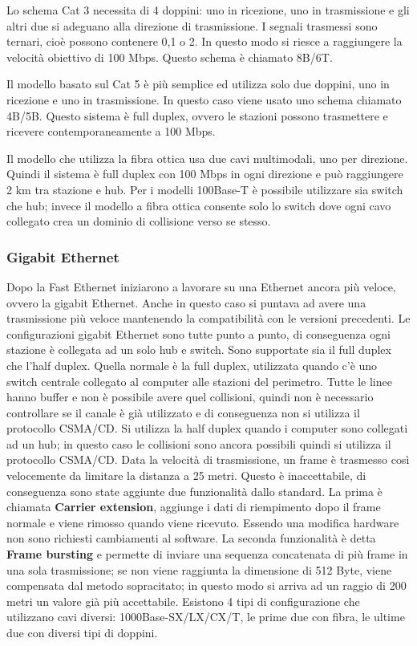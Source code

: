 Lo schema Cat 3 necessita di 4 doppini: uno in ricezione, uno in trasmissione e gli altri due si adeguano alla direzione di trasmissione.
I segnali trasmessi sono ternari, cioè possono contenere 0,1 o 2. 
In questo modo si riesce a raggiungere la velocità obiettivo di 100 Mbps. Questo schema è chiamato 8B/6T.

Il modello basato sul Cat 5 è più semplice ed utilizza solo due doppini, uno in ricezione e uno in trasmissione.
In questo caso viene usato uno schema chiamato 4B/5B.
Questo sistema è full duplex, ovvero le stazioni possono trasmettere e ricevere contemporaneamente a 100 Mbps.

Il modello che utilizza la fibra ottica usa due cavi multimodali, uno per direzione.
Quindi il sistema è full duplex con 100 Mbps in ogni direzione e può raggiungere 2 km tra stazione e hub.
Per i modelli 100Base-T è possibile utilizzare sia switch che hub;
invece il modello a fibra ottica consente solo lo switch dove ogni cavo collegato crea un dominio di collisione verso se stesso. 

\subsubsection{Gigabit Ethernet}
Dopo la Fast Ethernet iniziarono a lavorare su una Ethernet ancora più veloce, ovvero la gigabit Ethernet.
Anche in questo caso si puntava ad avere una trasmissione più veloce mantenendo la compatibilità con le versioni precedenti.
Le configurazioni gigabit Ethernet sono tutte punto a punto, di conseguenza ogni stazione è collegata ad un solo hub e switch.
Sono supportate sia il full duplex che l'half duplex.
Quella normale è la full duplex, utilizzata quando c'è uno switch centrale collegato al computer alle stazioni del perimetro.
Tutte le linee hanno buffer e non è possibile avere quel collisioni, quindi non è necessario controllare se il canale è già utilizzato e di conseguenza non si utilizza il protocollo CSMA/CD. 
Si utilizza la half duplex quando i computer sono collegati ad un hub; 
in questo caso le collisioni sono ancora possibili quindi si utilizza il protocollo CSMA/CD.
Data la velocità di trasmissione, un frame è trasmesso così velocemente da limitare la distanza a 25 metri.
Questo è inaccettabile, di conseguenza sono state aggiunte due funzionalità dallo standard.
La prima è chiamata \textbf{Carrier extension}, aggiunge i dati di riempimento dopo il frame normale e viene rimosso quando viene ricevuto. 
Essendo una modifica hardware non sono richiesti cambiamenti al software. 
La seconda funzionalità è detta \textbf{Frame bursting} e permette di inviare una sequenza concatenata di più frame in una sola trasmissione;
se non viene raggiunta la dimensione di 512 Byte, viene compensata dal metodo sopracitato;
in questo modo si arriva ad un raggio di 200 metri un valore già più accettabile.
Esistono 4 tipi di configurazione che utilizzano cavi diversi: 1000Base-SX/LX/CX/T, le prime due con fibra, le ultime due con diversi tipi di doppini.

